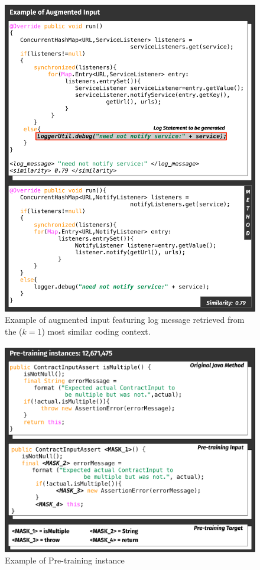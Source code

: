 \begin{figure}[h!]
	\label{fig:ir-example}
	\includegraphics[width=\columnwidth]{img/ir-example.pdf}
	\caption{Example of augmented input featuring log message retrieved from the ($k=1$) most similar coding context.}
\end{figure}

\begin{figure}[h!]
	\label{fig:pre-training}
	\includegraphics[width=\columnwidth]{img/pre-training.pdf}
		\caption{Example of Pre-training instance}
\end{figure}



